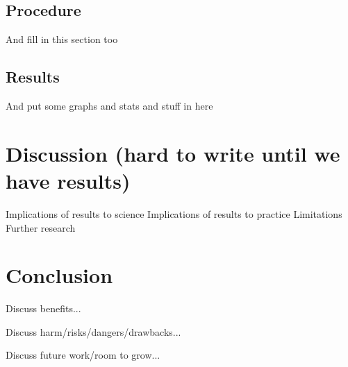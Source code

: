 \documentclass{sigchi}
\begin{document}
\subsection{Procedure}
And fill in this section too

\subsection{Results}
And put some graphs and stats and stuff in here

\section{Discussion (hard to write until we have results)}
Implications of results to science
Implications of results to practice 
Limitations
Further research 


\section{Conclusion}
Discuss benefits...

Discuss harm/risks/dangers/drawbacks...

Discuss future work/room to grow...








\balance{}

\nocite{*}


\end{document}
